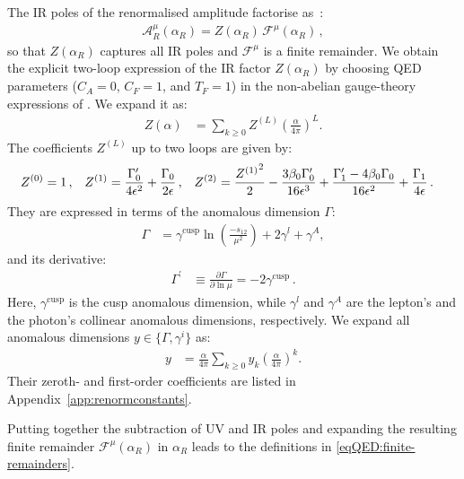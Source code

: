 \documentclass[main.tex]{subfiles}
\begin{document}
The IR poles of the renormalised amplitude factorise as~\cite{Catani:1998bh, Gardi:2009qi, Gardi:2009zv, Becher:2009cu, Becher:2009qa}:
\begin{align}
 \mathcal{A}^\mu_R (\alpha_R) = Z(\alpha_R) \,  \mathcal{F}^\mu(\alpha_R) \,,
\end{align}
so that $ Z(\alpha_R)$ captures all IR poles and $\mathcal{F}^\mu$ is a finite remainder.
We obtain the explicit two-loop expression of the IR factor $Z(\alpha_R)$ by
choosing QED parameters ($C_A=0$, $C_F=1$, and $T_F=1$) in the non-abelian gauge-theory expressions of . We expand it as:
\begin{align}
    Z(\alpha) &= \sum_{k\ge0} Z^{(L)} \left(\frac{\alpha}{4\pi}\right)^L .
\end{align}
The coefficients $Z^{(L)}$ up to two loops are given by:
\begin{align}
    \label{eq:ir-pole-coeffs}
    Z^{(0)} &= 1 \,, &
    Z^{(1)} &= \frac{\Gamma_0^\prime}{4\epsilon^2}+\frac{\Gamma_0}{2\epsilon} \,, &
    Z^{(2)} &= \frac{{Z^{(1)}}^2}{2} -\frac{3\beta_0\Gamma_0^\prime}{16\epsilon^3}+\frac{\Gamma_1^\prime-4\beta_0\Gamma_0}{16\epsilon^2}+\frac{\Gamma_1}{4\epsilon} \,.
\end{align}
They are expressed in terms of the anomalous dimension $\Gamma$:
\begin{align}
    \Gamma &= \gamma^\text{cusp}\ln\left(\frac{-s_{12}}{\mu^2}\right)+2\gamma^l+\gamma^A ,
\end{align}
and its derivative:
\begin{align}
    \Gamma^\prime &\equiv \frac{\partial\Gamma}{\partial\ln\mu} = -2\gamma^\text{cusp}\,.
\end{align}
Here, $\gamma^\text{cusp}$ is the cusp anomalous dimension, while $\gamma^l$ and $\gamma^A$ are the lepton's and the photon's collinear anomalous dimensions, respectively.
We expand all anomalous dimensions $y\in\{\Gamma,\gamma^i\}$ as:
\begin{align}
    y &= \frac{\alpha}{4\pi} \sum_{k\ge0} y_k \left(\frac{\alpha}{4\pi}\right)^k.
\end{align}
Their zeroth- and first-order coefficients are listed in Appendix~\ref{app:renormconstants}.

Putting together the subtraction of UV and IR poles and expanding the resulting finite remainder $\mathcal{F}^{\mu}(\alpha_R)$ in $\alpha_R$ leads to the definitions in \cref{eqQED:finite-remainders}.

\renewcommand{\theequation}{D.\arabic{equation}}
\end{document}
